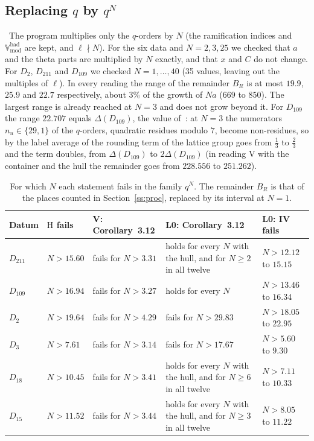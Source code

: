 \documentclass[11pt,a4paper]{article}
\newcommand{\Vbad}{\mathbb{V}_{\mathrm{mod}}^{\mathrm{bad}}}
\newcommand{\Ht}{\mathrm{H}}
\newcommand{\lab}[2]{{\upshape\fcolorbox{#1}{#1!8}{\scriptsize\sffamily\bfseries\textcolor{#1}{#2}}}}
\newcommand{\tagP}{\lab{ForestGreen}{P}}
\theoremstyle{plain}
\theoremstyle{definition}
\theoremstyle{remark}
\begin{document}
\subsection{Replacing \texorpdfstring{$q$}{q} by \texorpdfstring{$q^N$}{q\^N}}\label{ss:qN}
\tagP\ The program multiplies only the $q$-orders by $N$ (the ramification indices and $\Vbad$ are kept, and
$\ell\nmid N$). For the six data and $N=2,3,25$ we checked that $a$ and the theta parts are multiplied by $N$ exactly,
and that $x$ and $C$ do not change. For $D_2$, $D_{211}$ and $D_{109}$ we checked $N=1,\dots,40$ (35 values, leaving out
the multiples of $\ell$). In every reading the range of the remainder $B_R$ is at most $19.9$, $25.9$ and $22.7$
respectively, about $3\%$ of the growth of $Na$ ($669$ to $850$). The largest range is already reached at $N=3$ and
does not grow beyond it. For $D_{109}$ the range $22.707$ equals $\Delta(D_{109})$, the value of~\cite{Gap}: at $N=3$
the numerators $n_u\in\{29,1\}$ of the $q$-orders, quadratic residues modulo $7$, become non-residues, so by
\cite[Proposition~3.6]{Gap} the label average of the rounding term of the lattice group goes from $\frac13$ to
$\frac23$ and the term doubles, from $\Delta(D_{109})$ to $2\Delta(D_{109})$ (in reading V with the container and the
hull the remainder goes from $228.556$ to $251.262$).

\begin{table}[ht]\centering\small
\caption{For which $N$ each statement fails in the family $q^N$. The remainder $B_R$ is that of the places counted in
Section~\ref{ss:proc}, replaced by its interval at $N=1$.}\label{tab:qN}
\begin{tabular}{@{}lll>{\raggedright\arraybackslash}p{4.3cm}l@{}}
\toprule
Datum & $\Ht$ fails & V: Corollary~3.12 & L0: Corollary~3.12 & L0: IV fails\\
\midrule
$D_{211}$ & $N>15.60$ & fails for $N>3.31$ & holds for every $N$ with the hull, and for $N\ge2$ in all twelve & $N>12.12$ to $15.15$\\
$D_{109}$ & $N>16.94$ & fails for $N>3.27$ & holds for every $N$ & $N>13.46$ to $16.34$\\
$D_{2}$ & $N>19.64$ & fails for $N>4.29$ & fails for $N>29.83$ & $N>18.05$ to $22.95$\\
$D_{3}$ & $N>7.61$ & fails for $N>3.14$ & fails for $N>17.67$ & $N>5.60$ to $9.30$\\
$D_{18}$ & $N>10.45$ & fails for $N>3.41$ & holds for every $N$ with the hull, and for $N\ge6$ in all twelve & $N>7.11$ to $10.33$\\
$D_{15}$ & $N>11.52$ & fails for $N>3.44$ & holds for every $N$ with the hull, and for $N\ge3$ in all twelve & $N>8.05$ to $11.22$\\
\bottomrule
\end{tabular}
\end{table}
\end{document}
